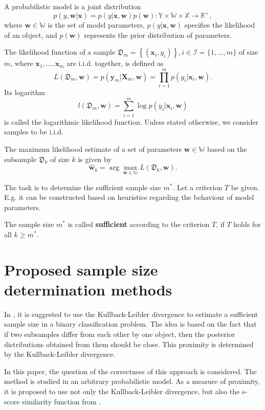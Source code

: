 \documentclass[runningheads]{llncs}
\begin{document}
A probabilistic model is a joint distribution
\[ p(y, \mathbf{w} | \mathbf{x}) = p(y | \mathbf{x}, \mathbf{w}) p(\mathbf{w}): \mathbb{Y} \times \mathbb{W} \times \mathbb{X} \to \mathbb{R}^+, \]
where $\mathbf{w} \in \mathbb{W}$ is the set of model parameters, $p(y | \mathbf{x}, \mathbf{w})$ specifies the likelihood of an object, and $p(\mathbf{w})$ represents the prior distribution of parameters.

The likelihood function of a sample $\mathfrak{D}_m = \left\{ (\mathbf{x}_i, y_i) \right\}, i \in \mathcal{I} = \{ 1, \ldots, m \}$ of size $m$, where $\mathbf{x}_1, \ldots, \mathbf{x}_m$ are i.i.d. together, is defined as 
\[ L(\mathfrak{D}_m, \mathbf{w}) = p(\mathbf{y}_m | \mathbf{X}_m, \mathbf{w}) = \prod_{i=1}^{m} p(y_i | \mathbf{x}_i, \mathbf{w}). \]
Its logarithm
\[ l(\mathfrak{D}_m, \mathbf{w}) = \sum\limits_{i=1}^{m} \log p(y_i | \mathbf{x}_i, \mathbf{w}) \]
is called the logarithmic likelihood function. Unless stated otherwise, we consider samples to be i.i.d.

The maximum likelihood estimate of a set of parameters $\mathbf{w} \in \mathbb{W}$ based on the subsample $\mathfrak{D}_k$ of size $k$ is given by 
\[ \hat{\mathbf{w}}_{k} = \arg\max_{\mathbf{w} \in \mathbb{W}} L(\mathfrak{D}_k, \mathbf{w}). \]

The task is to determine the sufficient sample size $m^*$. Let a criterion $T$ be given. E.g. it can be constructed based on heuristics regarding the behaviour of model parameters.
\begin{definition}
    The sample size $m^*$ is called \textbf{sufficient} according to the criterion $T$, if $T$ holds for all $k \geqslant m^*$.
\end{definition}

\section{Proposed sample size determination methods}
In \cite{MOTRENKO2014743}, it is suggested to use the Kullback-Leibler divergence to estimate a sufficient sample size in a binary classification problem. The idea is based on the fact that if two subsamples differ from each other by one object, then the posterior distributions obtained from them should be close. This proximity is determined by the Kullback-Leibler divergence. 

In this paper, the question of the correctness of this approach is considered. The method is studied in an arbitrary probabilistic model. As a measure of proximity, it is proposed to use not only the Kullback-Leibler divergence, but also the s-score similarity function from \cite{Aduenko2017}.
\end{document}
